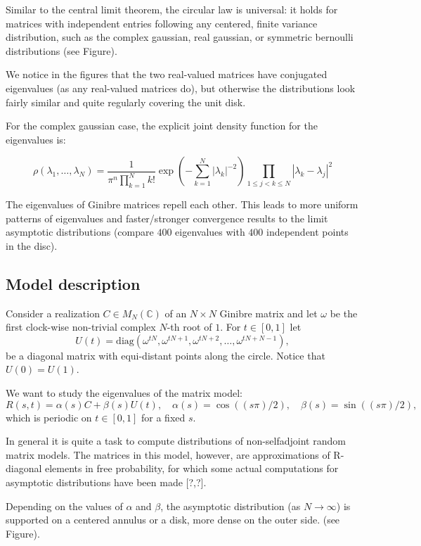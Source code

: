 \documentclass{article}
\begin{document}
	Similar to the central limit theorem, 
	the circular law is universal: 
	it holds for matrices with independent entries 
	following any centered, finite variance distribution,
	such as the complex gaussian, 
	real gaussian, or symmetric bernoulli distributions (see Figure).
	
	We notice in the figures that the two real-valued matrices have conjugated eigenvalues
	(as any real-valued matrices do),  
	but otherwise the distributions look fairly similar and quite regularly covering the unit disk.

	For the complex gaussian case, the explicit joint density function for
	the eigenvalues is:

	$$\rho (\lambda_1, \dots , \lambda_N) = 
	\frac{1}{\pi^n \prod_{k=1}^N k!}
	\exp(-\sum_{k=1}^N |\lambda_{k}|^{-2}) 
	\prod_{1\leq j < k \leq N} |\lambda_k - \lambda_j|^2$$

	The eigenvalues of Ginibre matrices repell each other. 
	This leads to more uniform patterns of eigenvalues and faster/stronger convergence results 
	to the limit asymptotic distributions 
	(compare $400$ eigenvalues with $400$ independent points in the disc).  

	\subsection{Model description}

	Consider a realization $C \in M_N(\mathbb{C})$ of an $N\times N$ Ginibre matrix and 
	let $\omega$ be the first clock-wise non-trivial complex $N$-th root of $1$. 
	For $t\in [0,1]$ let
	$$U(t) = \mathrm{diag}(\omega^{tN}, \omega^{tN+1}, \omega^{tN+2}, \dots   , \omega^{tN+N-1}),$$ 
	be a diagonal matrix with equi-distant points along the circle. Notice that $U(0) = U(1)$.

	We want to study the eigenvalues of the matrix model:
	$$R(s,t) = \alpha(s)C + \beta(s)U(t),\quad  \alpha(s)= \cos((s\pi)/2),\quad \beta(s)= \sin((s\pi) /2),$$ 
	which is periodic on $t\in [0,1]$ for a fixed $s$.

	In general it is quite a task to compute distributions 
	of non-selfadjoint random matrix models. 
	The matrices in this model, however, 
	are approximations of R-diagonal elements in free probability, 
	for which some actual computations for asymptotic distributions have been made [?,?]. 

	Depending on the values of $\alpha$ and $\beta$, 
	the asymptotic distribution (as $N\to\infty$) is supported on a centered annulus or a disk, 
	more dense on the outer side. 
	(see Figure). 
	
\end{document}
